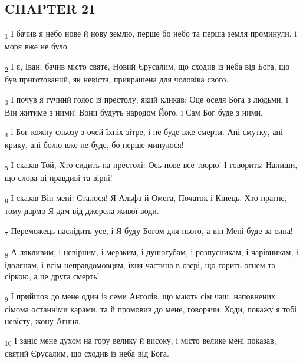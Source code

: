 \subsection{CHAPTER 21}
\begin{tcolorbox}
\textsubscript{1} І бачив я небо нове й нову землю, перше бо небо та перша земля проминули, і моря вже не було.
\end{tcolorbox}
\begin{tcolorbox}
\textsubscript{2} І я, Іван, бачив місто святе, Новий Єрусалим, що сходив із неба від Бога, що був приготований, як невіста, прикрашена для чоловіка свого.
\end{tcolorbox}
\begin{tcolorbox}
\textsubscript{3} І почув я гучний голос із престолу, який кликав: Оце оселя Бога з людьми, і Він житиме з ними! Вони будуть народом Його, і Сам Бог буде з ними,
\end{tcolorbox}
\begin{tcolorbox}
\textsubscript{4} і Бог кожну сльозу з очей їхніх зітре, і не буде вже смерти. Ані смутку, ані крику, ані болю вже не буде, бо перше минулося!
\end{tcolorbox}
\begin{tcolorbox}
\textsubscript{5} І сказав Той, Хто сидить на престолі: Ось нове все творю! І говорить: Напиши, що слова ці правдиві та вірні!
\end{tcolorbox}
\begin{tcolorbox}
\textsubscript{6} І сказав Він мені: Сталося! Я Альфа й Омега, Початок і Кінець. Хто прагне, тому дармо Я дам від джерела живої води.
\end{tcolorbox}
\begin{tcolorbox}
\textsubscript{7} Переможець наслідить усе, і Я буду Богом для нього, а він Мені буде за сина!
\end{tcolorbox}
\begin{tcolorbox}
\textsubscript{8} А лякливим, і невірним, і мерзким, і душогубам, і розпусникам, і чарівникам, і ідолянам, і всім неправдомовцям, їхня частина в озері, що горить огнем та сіркою, а це друга смерть!
\end{tcolorbox}
\begin{tcolorbox}
\textsubscript{9} І прийшов до мене один із семи Анголів, що мають сім чаш, наповнених сімома останніми карами, та й промовив до мене, говорячи: Ходи, покажу я тобі невісту, жону Агнця.
\end{tcolorbox}
\begin{tcolorbox}
\textsubscript{10} І заніс мене духом на гору велику й високу, і місто велике мені показав, святий Єрусалим, що сходив із неба від Бога.
\end{tcolorbox}
